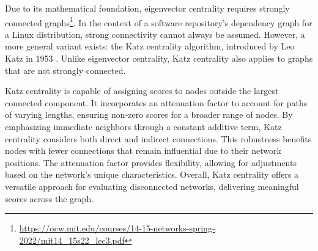 
Due to its mathematical foundation, eigenvector centrality requires strongly connected graphs\footnote{\url{https://ocw.mit.edu/courses/14-15-networks-spring-2022/mit14_15s22_lec3.pdf}}.
In the context of a software repository's dependency graph for a Linux distribution, strong connectivity cannot always be assumed.
However, a more general variant exists: the Katz centrality algorithm, introduced by Leo Katz in 1953 \cite{Katz1953}.
Unlike eigenvector centrality, Katz centrality also applies to graphs that are not strongly connected.


Katz centrality is capable of assigning scores to nodes outside the largest connected component.
It incorporates an attenuation factor to account for paths of varying lengths, ensuring non-zero scores for a broader range of nodes.
By emphasizing immediate neighbors through a constant additive term, Katz centrality considers both direct and indirect connections.
This robustness benefits nodes with fewer connections that remain influential due to their network positions.
The attenuation factor provides flexibility, allowing for adjustments based on the network's unique characteristics.
Overall, Katz centrality offers a versatile approach for evaluating disconnected networks, delivering meaningful scores across the graph.

